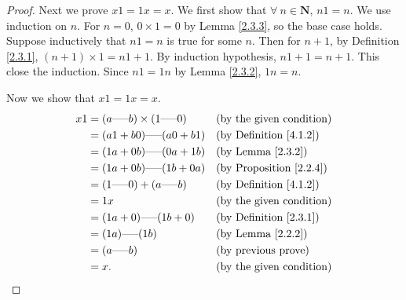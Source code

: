 \begin{proof}
    Next we prove \(x1 = 1x = x\).
    We first show that \(\forall\ n \in \mathbf{N}\), \(n1 = n\).
    We use induction on \(n\).
    For \(n=0\), \(0 \times 1 = 0\) by Lemma \ref{2.3.3}, so the base case holds.
    Suppose inductively that \(n1 = n\) is true for some \(n\).
    Then for \(n + 1\), by Definition \ref{2.3.1}, \((n + 1) \times 1 = n1 + 1\).
    By induction hypothesis, \(n1 + 1 = n + 1\).
    This close the induction.
    Since \(n1 = 1n\) by Lemma \ref{2.3.2}, \(1n = n\).

    Now we show that \(x1 = 1x = x\).
    \begin{align*}
        x1 & = (a \text{-----} b) \times (1 \text{-----} 0) &  & \text{(by the given condition)}     \\
           & = (a1 + b0) \text{-----} (a0 + b1)             &  & \text{(by Definition \ref{4.1.2})}  \\
           & = (1a + 0b) \text{-----} (0a + 1b)             &  & \text{(by Lemma \ref{2.3.2})}       \\
           & = (1a + 0b) \text{-----} (1b + 0a)             &  & \text{(by Proposition \ref{2.2.4})} \\
           & = (1 \text{-----} 0) + (a \text{-----} b)      &  & \text{(by Definition \ref{4.1.2})}  \\
           & = 1x                                           &  & \text{(by the given condition)}     \\
           & = (1a + 0) \text{-----} (1b + 0)               &  & \text{(by Definition \ref{2.3.1})}  \\
           & = (1a) \text{-----} (1b)                       &  & \text{(by Lemma \ref{2.2.2})}       \\
           & = (a \text{-----} b)                           &  & \text{(by previous prove)}          \\
           & = x.                                           &  & \text{(by the given condition)}
    \end{align*}


\end{proof}
